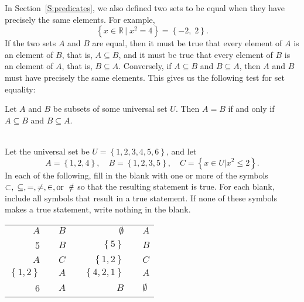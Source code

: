 In Section~\ref{S:predicates}, we also defined two sets to be equal when they have precisely the same elements.  For example,
\[
\left\{ {\left. {x \in \mathbb{R}\,} \right|\;x^2  = 4} \right\} = \left\{ { - 2,\;2} \right\}\!.
\]
If the two sets  $A$  and  $B$  are equal, then it must be true that every element of  $A$  is an element of  $B$, that is,  $A \subseteq B$, and it must be true that every element of  $B$  is an element of  $A$, that is, $B \subseteq A$.  Conversely, if  $A \subseteq B$  and   $B \subseteq A$, then  $A$  and  $B$  must have precisely the same elements.  This gives us the following test for set equality:
\begin{theorem} \label{T:setequality}
Let  $A$  and  $B$  be subsets of some universal set  $U$\!.  Then $A = B$  if and only if  $A \subseteq B$  and   $B \subseteq A$.
\end{theorem}

\noindent
\hbreak
\begin{prog} \label{prog:setnotation} \hfill \\
Let the universal set be $U = \left\{ {1,2,3,4,5,6} \right\}$, and let
\[
  A = \left\{ {1,2,4} \right\}\!, \quad  B = \left\{ {1,2,3,5} \right\}\!, \quad   
  C = \left\{ {\left. {x \in U} \right|x^2  \leq 2} \right\}\!. 
\]
In each of the following, fill in the blank with one or more of the symbols  $ \subset, \\ \subseteq, =, \ne, \in ,\text{or } \notin $ so that the resulting statement is true.  For each blank, include all symbols that result in a true statement.  If none of these symbols makes a true statement, write nothing in the blank.
\begin{center}
\begin{tabular}{r p{0.8in} l p{0.5in} r p{0.8in} l }
  $A$   &   & $B$   &   & $\emptyset$   &   & $A$ \\ \cline{2-2} \cline{6-6}
   5    &   & $B$   &   &  $\left\{ 5 \right\}$  & &  $B$ \\ \cline{2-2} \cline{6-6}
  $A$   &   & $C$   &   &  $\left\{ {1,2} \right\}$  &  &  $C$ \\ \cline{2-2} \cline{6-6}
  $\left\{ {1, 2} \right\}$ &  &  $A$ &  &  $\left\{ {4,2,1} \right\}$ & & $A$ \\ \cline{2-2} \cline{6-6}
  6     &  &  $A$ &  &  $B$  &  & $\emptyset$ \\ \cline{2-2} \cline{6-6}
\end{tabular}
\end{center}
\end{prog}
\hbreak

\endinput

